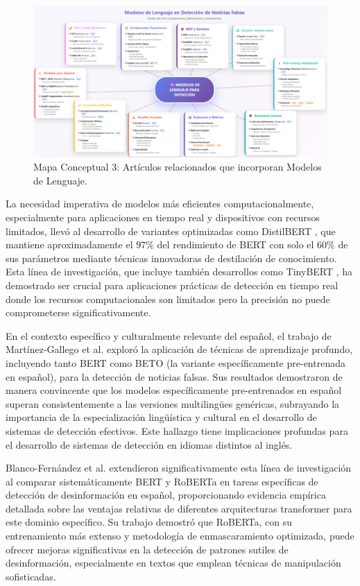 \begin{figure}[h!]
    \centering
    \includegraphics[width=\textwidth]{Imagenes/mapaConceptual3.png}
    \caption{Mapa Conceptual 3: Artículos relacionados que incorporan Modelos de Lenguaje.}
    \label{fig:mapa_conceptual_3}
\end{figure}

La necesidad imperativa de modelos más eficientes computacionalmente, especialmente para aplicaciones en tiempo real y dispositivos con recursos limitados, llevó al desarrollo de variantes optimizadas como DistilBERT \cite{sanh2019distilbert}, que mantiene aproximadamente el $97\%$ del rendimiento de BERT con solo el $60\%$ de sus parámetros mediante técnicas innovadoras de destilación de conocimiento. Esta línea de investigación, que incluye también desarrollos como TinyBERT \cite{jiao2019tinybert}, ha demostrado ser crucial para aplicaciones prácticas de detección en tiempo real donde los recursos computacionales son limitados pero la precisión no puede comprometerse significativamente.

En el contexto específico y culturalmente relevante del español, el trabajo de Martínez-Gallego et al. \cite{martinez2021fake} exploró la aplicación de técnicas de aprendizaje profundo, incluyendo tanto BERT como BETO (la variante específicamente pre-entrenada en español), para la detección de noticias falsas. Sus resultados demostraron de manera convincente que los modelos específicamente pre-entrenados en español superan consistentemente a las versiones multilingües genéricas, subrayando la importancia de la especialización lingüística y cultural en el desarrollo de sistemas de detección efectivos. Este hallazgo tiene implicaciones profundas para el desarrollo de sistemas de detección en idiomas distintos al inglés.

Blanco-Fernández et al. \cite{blanco2024enhancing} extendieron significativamente esta línea de investigación al comparar sistemáticamente BERT y RoBERTa en tareas específicas de detección de desinformación en español, proporcionando evidencia empírica detallada sobre las ventajas relativas de diferentes arquitecturas transformer para este dominio específico. Su trabajo demostró que RoBERTa, con su entrenamiento más extenso y metodología de enmascaramiento optimizada, puede ofrecer mejoras significativas en la detección de patrones sutiles de desinformación, especialmente en textos que emplean técnicas de manipulación sofisticadas.

